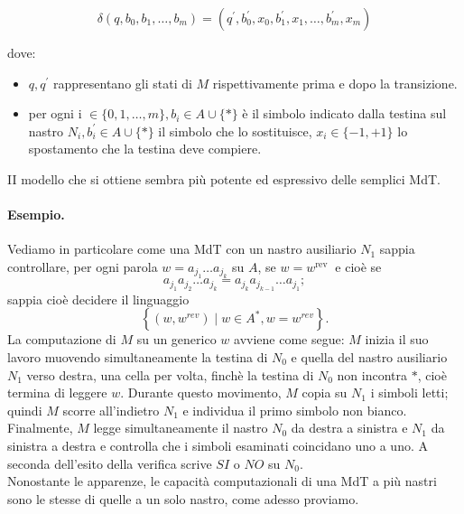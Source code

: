 $$
    \delta\left(q, b_0, b_1, \ldots, b_m\right)=\left(q^{\prime}, b^{\prime}_0, x_0, b_1^{\prime}, x_1, \ldots, b_m^{\prime}, x_m\right)
$$

dove:

\begin{itemize}
    \item $q, q^{\prime}$ rappresentano gli stati di $M$ rispettivamente prima e dopo
          la transizione.
    \item per ogni i $\in\{0,1, \ldots, m\}, b_i \in A \cup\{*\}$ è il
          simbolo indicato dalla testina sul nastro $N_i, b^{\prime}_i \in A \cup\{*\}$ il simbolo che
          lo sostituisce, $x_i \in\{-1,+1\}$ lo spostamento che la testina deve compiere.

\end{itemize}

II modello che si ottiene sembra più potente ed espressivo delle semplici MdT.

\paragraph{Esempio.} Vediamo in particolare come una MdT con un nastro ausiliario
$N_1$ sappia controllare, per ogni parola $w=a_{j_1} \ldots a_{j_k}$ su $A$, se
$w=w^{\text {rev }}$ e cioè se
$$
    a_{j_1} a_{j_2} \ldots a_{j_k}=a_{j_k} a_{j_{k-1}} \ldots a_{j_1};
$$
sappia cioè decidere il linguaggio
$$
    \left\{\left(w, w^{r e v}\right) \mid w \in A^*, w=w^{r e v}\right\} .
$$
La computazione di $M$ su un generico $w$ avviene come segue: $M$ inizia il suo
lavoro muovendo simultaneamente la testina di $N_0$ e quella del nastro ausiliario
$N_1$ verso destra, una cella per volta, finchè la testina di $N_0$ non incontra
$*$, cioè termina di leggere $w$. Durante questo movimento, $M$
copia su $N_1$ i simboli letti; quindi $M$ scorre all'indietro $N_1$ e individua il
primo simbolo non bianco. Finalmente, $M$ legge simultaneamente il nastro $N_0$ da
destra a sinistra e $N_1$ da sinistra a destra e controlla che i simboli esaminati
coincidano uno a uno. A seconda dell'esito della verifica scrive $SI$ o $NO$ su $N_0$.\\

Nonostante le apparenze, le capacità computazionali di una MdT a più nastri sono le
stesse di quelle a un solo nastro, come adesso proviamo.